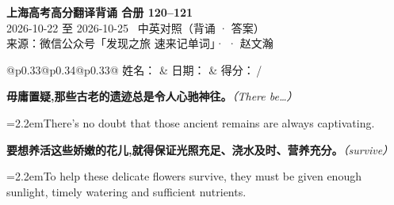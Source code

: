 \documentclass[11pt,a4paper]{article}
\newcommand{\num}[1]{\makebox[1.9em][r]{#1.}\hspace{0.3em}}
\newcommand{\prompt}[1]{\emph{\textcolor{tipblue}{\small（#1）}}}
\begin{document}
\pagestyle{plain}
\begin{center}
{\LARGE\bfseries 上海高考高分翻译背诵 \quad 合册 120–121}\\[0.25em]
{\large 2026-10-22 至 2026-10-25 \quad\ 中英对照（背诵 · 答案）}\\[0.35em]
{\footnotesize 来源：微信公众号「发现之旅 速来记单词」·  · 赵文瀚}
\end{center}

\vspace{0.4em}
\noindent\begin{tabular}{@{}p{0.33\textwidth}@{}p{0.34\textwidth}@{}p{0.33\textwidth}@{}}
姓名：\underline{\hspace{2.0cm}} & 日期：\underline{\hspace{2.0cm}} & 得分：\underline{\hspace{1.4cm}}\,/ \\
\end{tabular}

\vspace{0.5em}

\vspace{0.8em}
\vspace{0.35em}\vspace{0.15em}

\begin{minipage}{\linewidth}

\num{1}\textbf{毋庸置疑,那些古老的遗迹总是令人心驰神往。}\prompt{There be…}

\vspace{0.15em}

\noindent\hangindent=2.2em\hspace{2.2em}There’s no doubt that those ancient remains are always captivating.

\end{minipage}

\begin{minipage}{\linewidth}

\num{2}\textbf{要想养活这些娇嫩的花儿,就得保证光照充足、浇水及时、营养充分。}\prompt{survive}

\vspace{0.15em}

\noindent\hangindent=2.2em\hspace{2.2em}To help these delicate flowers survive, they must be given enough sunlight, timely watering and sufficient nutrients.

\end{minipage}
\end{document}
